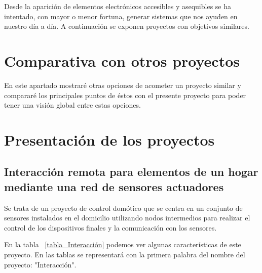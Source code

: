 \begin{comment}
Este apartado sería parecido a un estado del arte de una tesis o tesina. En un trabajo final grado no parece obligada su presencia, aunque se puede dejar a juicio del tutor el incluir un pequeño resumen comentado de los trabajos y proyectos ya realizados en el campo del proyecto en curso. 
\end{comment}


Desde la aparición de elementos electrónicos accesibles y asequibles se ha intentado, con mayor o menor fortuna, generar sistemas que nos ayuden en nuestro día a día. A continuación se exponen proyectos con objetivos similares.

\section{Comparativa con otros proyectos}
En este apartado mostraré otras opciones de acometer un proyecto similar y compararé los principales puntos de éstos con el presente proyecto para poder tener una visión global entre estas opciones.

\section{Presentación de los proyectos}
\subsection{Interacción remota para elementos de un hogar mediante una red de sensores actuadores}
Se trata de un proyecto de control domótico que se centra en un conjunto de sensores instalados en el domicilio utilizando nodos intermedios para realizar el control de los dispositivos finales y la comunicación con los sensores.

En la tabla ~\ref{tabla_Interacción} podemos ver algunas características de este proyecto.
En las tablas se representará con la primera palabra del nombre del proyecto: "Interacción".

